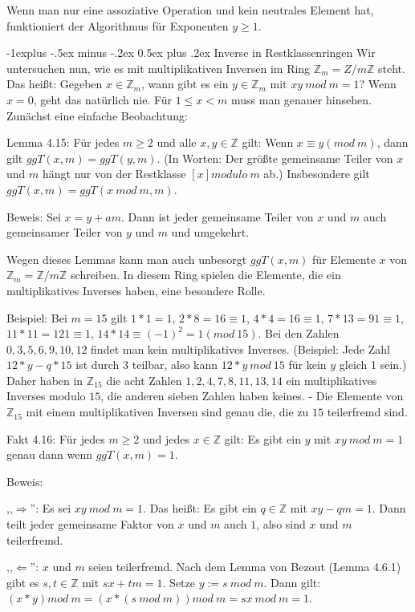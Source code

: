 \documentclass[a4paper]{article}
\makeatletter
\renewcommand{\subsection}{\@startsection{subsection}{2}{0mm}%
 {-1explus -.5ex minus -.2ex}%
 {0.5ex plus .2ex}%
 {\normalfont\normalsize\bfseries}}
\makeatother
\begin{document}
\begin{multicols}{3}
    Wenn man nur eine assoziative Operation und kein neutrales Element hat, funktioniert der Algorithmus für Exponenten $y\geq 1$.

    \subsection{Inverse in Restklassenringen}
    Wir untersuchen nun, wie es mit multiplikativen Inversen im Ring $\mathbb{Z}_m =Z/m\mathbb{Z}$ steht. Das heißt: Gegeben $x\in\mathbb{Z}_m$, wann gibt es ein $y\in\mathbb{Z}_m$ mit $xy\ mod\ m= 1$? Wenn $x=0$, geht das natürlich nie. Für $1\leq x<m$ muss man genauer hinsehen.
    Zunächst eine einfache Beobachtung:

    Lemma 4.15: Für jedes $m\geq 2$ und alle $x,y\in\mathbb{Z}$ gilt: Wenn $x\equiv y(mod\ m)$, dann gilt $ggT(x,m)=ggT(y,m)$. (In Worten: Der größte gemeinsame Teiler von $x$ und $m$ hängt nur von der Restklasse $[x] modulo\ m$ ab.) Insbesondere gilt $ggT(x,m) = ggT(x\ mod\ m,m)$.

    Beweis: Sei $x=y+am$. Dann ist jeder gemeinsame Teiler von $x$ und $m$ auch gemeinsamer Teiler von $y$ und $m$ und umgekehrt.

    Wegen dieses Lemmas kann man auch unbesorgt $ggT(x,m)$ für Elemente $x$ von $\mathbb{Z}_m =\mathbb{Z}/m\mathbb{Z}$ schreiben. In diesem Ring spielen die Elemente, die ein multiplikatives Inverses haben, eine besondere Rolle.

    Beispiel: Bei $m=15$ gilt $1*1=1$, $2*8 = 16\equiv 1$, $4*4 = 16\equiv 1$, $7*13 = 91\equiv 1$, $11*11 = 121\equiv 1$, $14* 14 \equiv (-1)^2 = 1 (mod\ 15)$. Bei den Zahlen $0, 3 , 5 , 6 , 9 , 10 , 12$ findet man kein multiplikatives Inverses. (Beispiel: Jede Zahl $12*y-q*15$ ist durch $3$ teilbar, also kann $12*y\ mod\ 15$ für kein $y$ gleich 1 sein.) Daher haben in $\mathbb{Z}_{15}$ die acht Zahlen $1, 2, 4, 7, 8, 11, 13, 14$ ein multiplikatives Inverses modulo $15$, die anderen sieben Zahlen haben keines. - Die Elemente von $\mathbb{Z}_{15}$ mit einem multiplikativen Inversen sind genau die, die zu $15$ teilerfremd sind.

    Fakt 4.16: Für jedes $m\geq 2$ und jedes $x\in\mathbb{Z}$ gilt: Es gibt ein $y$ mit $xy\ mod\ m=1$ genau dann wenn $ggT(x,m)=1$.

    Beweis:
    \begin{itemize*}
        \item ,,$\Rightarrow$'': Es sei $xy\ mod\ m= 1$. Das heißt: Es gibt ein $q\in\mathbb{Z}$ mit $xy-qm=1$. Dann teilt jeder gemeinsame Faktor von $x$ und $m$ auch $1$, also sind $x$ und $m$ teilerfremd.
        \item ,,$\Leftarrow$'': $x$ und $m$ seien teilerfremd. Nach dem Lemma von Bezout (Lemma 4.6.1) gibt es $s,t\in\mathbb{Z}$ mit $sx+tm=1$. Setze $y:=s\ mod\ m$. Dann gilt: $(x*y) mod\ m= (x*(s\ mod\ m)) mod\ m=sx\ mod\ m= 1$.
    \end{itemize*}


\end{multicols}
\end{document}
